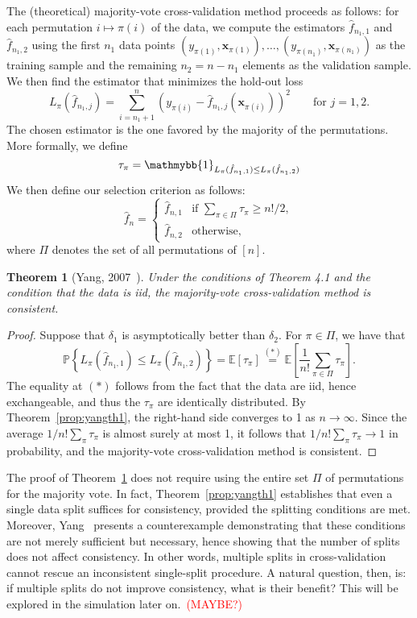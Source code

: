 \documentclass[12pt, letter paper]{article}
\newcommand{\1}{\mathmybb{1}}
\newtheorem{theorem}[proposition]{Theorem}
\newcommand{\0}{\emptyset}
\newcommand{\prob}{\mathbb{P}}
\newcommand{\Ep}[1]{\mathbb{E}\left[ #1 \right]}
\newcommand{\paren}[1]{\left(#1 \right)}
\newcommand{\set}[1]{\left\{ #1 \right\}}
\newcommand{\ind}[1]{\mathmybb{1}_{#1}}
\newcommand{\x}{\boldsymbol{x}}
\newcommand{\fhat}[2]{\hat{f}_{#1, #2}}
\begin{document}
The (theoretical) majority-vote cross-validation method proceeds as follows: for each permutation \(i\mapsto\pi(i)\) of the data, we compute the estimators \(\fhat{n_{1}}{1}\) and \(\fhat{n_{1}}{2}\) using the first \(n_{1}\) data points \((y_{\pi(1)}, \x_{\pi(1)}), \ldots,(y_{\pi(n_1)}, \x_{\pi(n_1)})\) as the training sample and the remaining \(n_{2}=n-n_{1}\) elements as the validation sample. We then find the estimator that minimizes the hold-out loss
\[L_{\pi}(\fhat{n_{1}}{j}) = \sum_{i=n_{1}+1}^{n}\paren{y_{\pi(i)} - \fhat{n_{1}}{j}\paren{\x_{\pi(i)}}}^{2}\qquad \text{for }j=1,2.\]
The chosen estimator is the one favored by the majority of the permutations. More formally, we define 
\[\tau_{\pi} = \ind{L_{\pi}(\fhat{n_{1}}{1}) \leq L_{\pi}(\fhat{n_{1}}{2})}\]
We then define our selection criterion as follows:
\[\hat{f}_{n} = \begin{cases}
    \fhat{n}{1} &\text{if }\sum_{\pi\in\Pi}\tau_{\pi} \geq {n!}/{2},\\[2mm]
    \fhat{n}{2} &\text{otherwise,}
\end{cases}\]
where \(\Pi\) denotes the set of all permutations of \([n]\).

\begin{theorem}[Yang, 2007~\cite{yang_2007}]\label{prop:yangth2}
    Under the conditions of Theorem 4.1 and the condition that the data is iid, the majority-vote cross-validation method is consistent.
\end{theorem}

\begin{proof}
    Suppose that \(\delta_{1}\) is asymptotically better than \(\delta_{2}\). For \(\pi\in \Pi\), we have that
    \[\prob\set{L_{\pi}\paren{\fhat{n_{1}}{1}} \leq L_{\pi}\paren{\fhat{n_{1}}{2}}} = \Ep{\tau_{\pi}} \stackrel{(*)}{=} \Ep{\frac{1}{n!}\sum_{\pi\in\Pi}\tau_{\pi}}.\]
    The equality at \((*)\) follows from the fact that the data are iid, hence exchangeable, and thus the \(\tau_\pi\) are identically distributed. By Theorem~\ref{prop:yangth1}, the right-hand side converges to 1 as \(n\to\infty\). Since the average \(1/n! \sum_{\pi}\tau_{\pi}\) is almost surely at most 1, it follows that \(1/n! \sum_{\pi}\tau_{\pi} \to 1\) in probability, and the majority-vote cross-validation method is consistent.
\end{proof}

The proof of Theorem~\ref{prop:yangth2} does not require using the entire set \(\Pi\) of permutations for the majority vote. In fact, Theorem~\ref{prop:yangth1} establishes that even a single data split suffices for consistency, provided the splitting conditions are met. Moreover, Yang~\cite{yang_2007} presents a counterexample demonstrating that these conditions are not merely sufficient but necessary, hence showing that the number of splits does not affect consistency. In other words, multiple splits in cross-validation cannot rescue an inconsistent single-split procedure. A natural question, then, is: if multiple splits do not improve consistency, what is their benefit? This will be explored in the simulation later on.~\textcolor{red}{(MAYBE?)}
\end{document}
